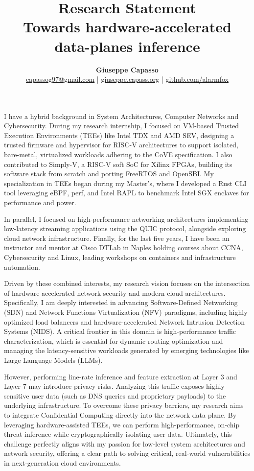 \documentclass[11pt,a4paper]{article}
\title{
    \vspace{-1in}
    \large \textbf{Research Statement}\\
    \huge \textbf{Towards hardware-accelerated data-planes inference}\\
    \large \textit{}
}
\author{\textbf{Giuseppe Capasso} \\ \href{mailto:capassog97@gmail.com}{capassog97@gmail.com} | \href{https://giuseppe.capass.org}{giuseppe.capass.org} | \href{https://github.com/alarmfox}{github.com/alarmfox}}
\date{}
\begin{document}
\maketitle
I have a hybrid background in System Architectures, Computer Networks and Cybersecurity. During my research internship, I focused on VM-based Trusted Execution Environments (TEEs) like Intel TDX and AMD SEV, designing a trusted firmware and hypervisor for RISC-V architectures to support isolated, bare-metal, virtualized workloads adhering to the CoVE specification. I also contributed to Simply-V, a RISC-V soft SoC for Xilinx FPGAs, building its software stack from scratch and porting FreeRTOS and OpenSBI. My specialization in TEEs began during my Master's, where I developed a Rust CLI tool leveraging eBPF, perf, and Intel RAPL to benchmark Intel SGX enclaves for performance and power.

In parallel, I focused on high-performance networking architectures implementing low-latency streaming applications using the QUIC protocol, alongside exploring cloud network infrastructure. Finally, for the last five years, I have been an instructor and mentor at Cisco DTLab in Naples holding courses about CCNA, Cybersecurity and Linux, leading workshops on containers and infrastructure automation.

Driven by these combined interests, my research vision focuses on the intersection of hardware-accelerated network security and modern cloud architectures. Specifically, I am deeply interested in advancing Software-Defined Networking (SDN) and Network Functions Virtualization (NFV) paradigms, including highly optimized load balancers and hardware-accelerated Network Intrusion Detection Systems (NIDS). A critical frontier in this domain is high-performance traffic characterization, which is essential for dynamic routing optimization and managing the latency-sensitive workloads generated by emerging technologies like Large Language Models (LLMs).

However, performing line-rate inference and feature extraction at Layer 3 and Layer 7 may introduce privacy risks. Analyzing this traffic exposes highly sensitive user data (such as DNS queries and proprietary payloads) to the underlying infrastructure. To overcome these privacy barriers, my research aims to integrate Confidential Computing directly into the network data plane. By leveraging hardware-assisted TEEs, we can perform high-performance, on-chip threat inference while cryptographically isolating user data. Ultimately, this challenge perfectly aligns with my passion for low-level system architectures and network security, offering a clear path to solving critical, real-world vulnerabilities in next-generation cloud environments.
\end{document}
